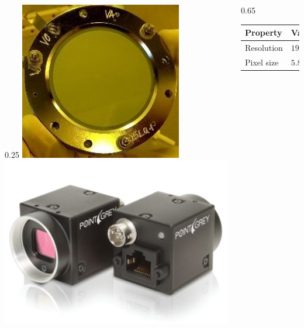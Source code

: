 \begin{frame}[t]
  \begin{columns}[T]
    \begin{column}{0.25\textwidth}
      \centering
      \includegraphics[width=0.7\textwidth]{03_SIM/fig/fig000_MCP_photo}
      \includegraphics[width=1\textwidth]{03_SIM/fig/fig000_MCP_camera}
    \end{column}
    \begin{column}{0.65\textwidth}
      \begin{tabularx}{\linewidth}{XX}
        \toprule
        Property        & Value                                            \\
        \midrule
        Resolution      & $1936\,\mathrm{(H)}\,\times\,1216\,\mathrm{(V)}$ \\
        Pixel size      & $5.86\,\mathrm{\mu m}$                           \\

\end{tabularx}
\end{column}
\end{columns}
\end{frame}
